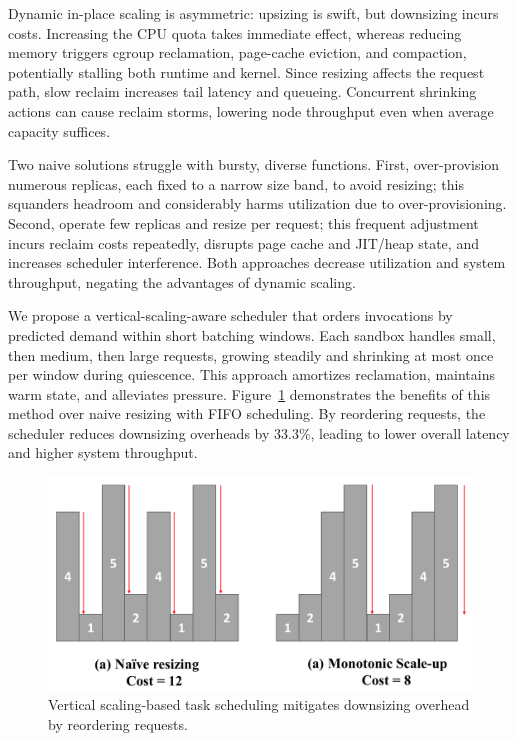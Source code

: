  Dynamic in-place
scaling is asymmetric: upsizing is swift, but downsizing incurs costs. Increasing
the CPU quota takes immediate effect, whereas reducing memory triggers cgroup
reclamation, page-cache eviction, and compaction, potentially stalling both
runtime and kernel. Since resizing affects the request path, slow reclaim
increases tail latency and queueing. Concurrent shrinking actions can cause
reclaim storms, lowering node throughput even when average capacity suffices.

Two naive solutions struggle with bursty, diverse functions. First, over-provision
numerous replicas, each fixed to a narrow size band, to avoid resizing; this
squanders headroom and considerably harms utilization due to over-provisioning.
Second, operate few replicas and resize per request; this frequent adjustment
incurs reclaim costs repeatedly, disrupts page cache and JIT/heap state, and
increases scheduler interference. Both approaches decrease utilization and system
throughput, negating the advantages of dynamic scaling.

We propose a vertical-scaling-aware scheduler that orders invocations by predicted
demand within short batching windows. Each sandbox handles small, then medium,
then large requests, growing steadily and shrinking at most once per window during
quiescence. This approach amortizes reclamation, maintains warm state, and
alleviates pressure. Figure~\ref{fig:vertical_scaling_scheduling} demonstrates
the benefits of this method over naive resizing with FIFO scheduling. By reordering
requests, the scheduler reduces downsizing overheads by 33.3\%, leading to lower
overall latency and higher system throughput.
\begin{figure}[t]
  \centering
  \includegraphics[width=1.0\linewidth]
  {figures/background/vertical.pdf}
  \caption{Vertical scaling-based task scheduling mitigates downsizing overhead
  by reordering requests.}
  \label{fig:vertical_scaling_scheduling}
\end{figure}

